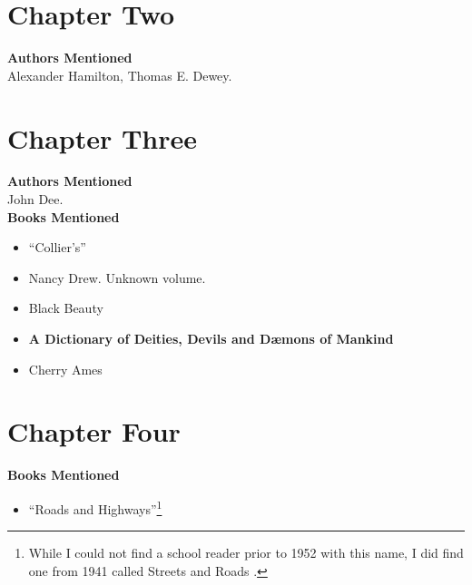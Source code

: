 \documentclass[12pt,makeidx]{extreport}
\begin{document}
\section{Chapter Two}
\textbf{Authors Mentioned}\\
Alexander Hamilton, Thomas E. Dewey.

\section{Chapter Three}
\textbf{Authors Mentioned}\\
John Dee.
\\


\hspace{-1.5em}\textbf{Books Mentioned}
\begin{itemize}
\item ``Collier’s'' \parencite{1952b}
\item Nancy Drew. Unknown volume.\parencite{NancyDrew}
\item Black Beauty \parencite{Sewell1887}
\item \textbf{A Dictionary of Deities, Devils and Dæmons of Mankind} \parencite{St.Phalle}
\item Cherry Ames \parencite{WellsPre1952}
\end{itemize}

\section{Chapter Four}
\textbf{Books Mentioned}\\
\begin{itemize}
\item ``Roads and Highways''\footnote{While I could not find a school reader prior to 1952 with this name, I did find one from 1941 called Streets and Roads \parencite{Gray1941}.} \parencite{UnknownRH}
\end{itemize}
\end{document}
